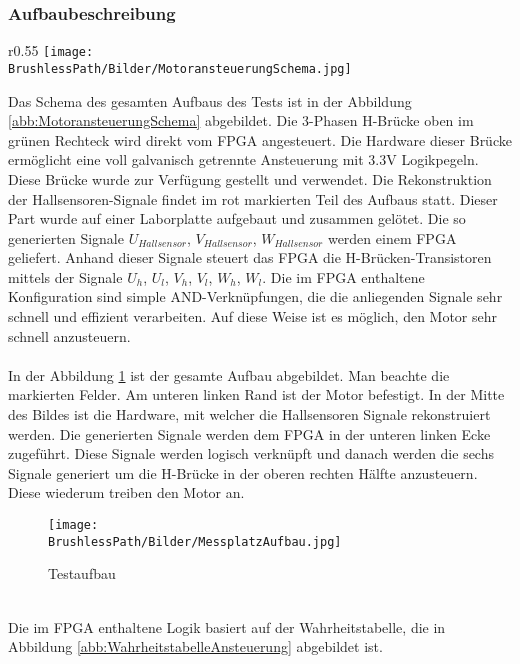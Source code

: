   \subsubsection{Aufbaubeschreibung}
        \begin{wrapfigure}{r}{0.55\textwidth}
           	\texttt{[image: \\BrushlessPath/Bilder/MotoransteuerungSchema.jpg]}
           	\centering
           	\caption{Schema des Brushless-Versuchsaufbaus}
            \label{abb:MotoransteuerungSchema}
        \end{wrapfigure}
        Das Schema des gesamten Aufbaus des Tests ist in der Abbildung 
        \ref{abb:MotoransteuerungSchema} abgebildet. Die 3-Phasen H-Brücke 
        oben im grünen Rechteck wird direkt vom FPGA angesteuert. Die Hardware 
        dieser Brücke ermöglicht eine voll galvanisch getrennte Ansteuerung 
        mit 3.3V Logikpegeln. Diese Brücke wurde zur Verfügung gestellt und 
        verwendet. Die Rekonstruktion der Hallsensoren-Signale findet im rot 
        markierten Teil des Aufbaus statt. Dieser Part wurde auf einer 
        Laborplatte aufgebaut und zusammen gelötet. Die so generierten Signale 
        $U_{Hallsensor}$, $V_{Hallsensor}$, $W_{Hallsensor}$ werden einem FPGA 
        geliefert. Anhand dieser Signale steuert das FPGA die 
        H-Brücken-Transistoren mittels der Signale $U_h$, $U_l$, $V_h$, $V_l$, 
        $W_h$, $W_l$. Die im FPGA enthaltene Konfiguration sind simple 
        AND-Verknüpfungen, die die anliegenden Signale sehr schnell und 
        effizient verarbeiten. Auf diese Weise ist es möglich, den Motor sehr 
        schnell anzusteuern.\\
        \\
        In der Abbildung \ref{abb:MessplatzAufbau} ist der gesamte Aufbau 
        abgebildet. Man beachte die markierten Felder. Am unteren linken Rand 
        ist der Motor befestigt. In der Mitte des Bildes ist die Hardware, mit 
        welcher die Hallsensoren Signale rekonstruiert werden. Die generierten 
        Signale werden dem FPGA in der unteren linken Ecke zugeführt. Diese 
        Signale werden logisch verknüpft und danach werden die sechs Signale 
        generiert um die H-Brücke in der oberen rechten Hälfte anzusteuern. 
        Diese wiederum treiben den Motor an.
        \begin{figure}[h!]
           	\texttt{[image: \\BrushlessPath/Bilder/MessplatzAufbau.jpg]}
           	\centering
           	\caption{Testaufbau} 
            \label{abb:MessplatzAufbau}
        \end{figure}\\
        Die im FPGA enthaltene Logik basiert auf der Wahrheitstabelle, die in 
        Abbildung \ref{abb:WahrheitstabelleAnsteuerung} abgebildet ist.
        
